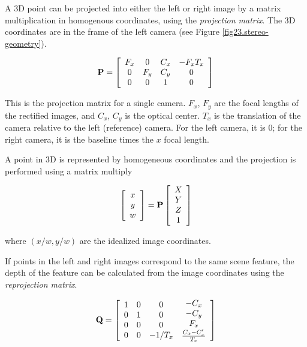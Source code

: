 \documentclass[twocolumn,oneside]{book}
\def\vec#1{\begin{array}{c}#1\end{array}}
\begin{document}
A 3D point can be projected into either the left or right image by a
matrix multiplication in homogenous coordinates, using the {\em
projection matrix}.  The 3D coordinates are in the frame of the left
camera (see Figure \ref{fig23.stereo-geometry}).

\begin{eqnarray}
\bf{P} =
\left[ 
\vec{F_x \\ 0 \\ 0}
\vec{ 0\\ F_y \\ 0}
\vec{ C_x \\ C_y \\ 1}
\vec{ -F_x T_x \\ 0 \\ 0} 
\right]
\end{eqnarray}

This is the projection matrix for a single camera.  $F_x$, $F_y$ are
the focal lengths of the rectified images, and $C_x$,
$C_y$ is the optical center.  $T_x$ is the translation of
the camera relative to the left (reference) camera.  For the left
camera, it is 0; for the right camera, it is the baseline times the
$x$ focal length.

A point in 3D is represented by homogeneous coordinates and the
projection is performed using a matrix multiply

\begin{eqnarray}
\left[
\vec{x\\ y\\ w}
\right] 
=
 \bf{P} \left[ \vec{X\\ Y\\ Z \\ 1} \right]
\end{eqnarray}
 
\noindent where $(x/w, y/w)$ are the idealized image coordinates.

If points in the left and right images correspond to the same scene
feature, the depth of the feature can be calculated from the image
coordinates using the {\em reprojection matrix}.

\begin{eqnarray}
\bf{Q} =
\left[ 
\vec{1 \\ 0 \\ 0 \\ 0}
\vec{0 \\ 1 \\ 0 \\ 0}
\vec{0 \\ 0 \\ 0 \\ -1/T_x}
\vec{-C_x \\ -C_y \\ F_x \\ \frac{C_x - C_x'}{T_x}} 
\right]
\end{eqnarray}
\end{document}
